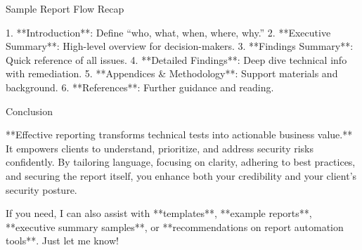 Sample Report Flow Recap

1. **Introduction**: Define “who, what, when, where, why.”
2. **Executive Summary**: High-level overview for decision-makers.
3. **Findings Summary**: Quick reference of all issues.
4. **Detailed Findings**: Deep dive technical info with remediation.
5. **Appendices \& Methodology**: Support materials and background.
6. **References**: Further guidance and reading.

Conclusion

**Effective reporting transforms technical tests into actionable business value.** It empowers clients to understand, prioritize, and address security risks confidently. By tailoring language, focusing on clarity, adhering to best practices, and securing the report itself, you enhance both your credibility and your client’s security posture.


If you need, I can also assist with **templates**, **example reports**, **executive summary samples**, or **recommendations on report automation tools**. Just let me know!